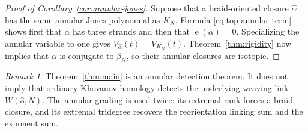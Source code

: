\documentclass[11pt]{amsart}
\theoremstyle{remark}
\newtheorem{remark}[theorem]{Remark}
\newcommand{\e}{\operatorname{e}}
\begin{document}
\begin{proof}[Proof of Corollary~\ref{cor:annular-jones}]
Suppose that a braid-oriented closure \(\widehat\alpha\) has the same annular Jones
polynomial as \(K_N\).  Formula \eqref{eq:top-annular-term} shows first that
\(\alpha\) has three strands and then that \(\e(\alpha)=0\).  Specializing the
annular variable to one gives
\(V_{\widehat\alpha}(t)=V_{K_N}(t)\).  Theorem~\ref{thm:rigidity} now implies that
\(\alpha\) is conjugate to \(\beta_N\), so their annular closures are isotopic.
\end{proof}

\begin{remark}\label{rem:ordinary}
Theorem~\ref{thm:main} is an annular detection theorem.  It does not imply that
ordinary Khovanov homology detects the underlying weaving link \(W(3,N)\).  The
annular grading is used twice: its extremal rank forces a braid closure, and its
extremal tridegree recovers the reorientation linking sum and the exponent sum.
\end{remark}
\end{document}
